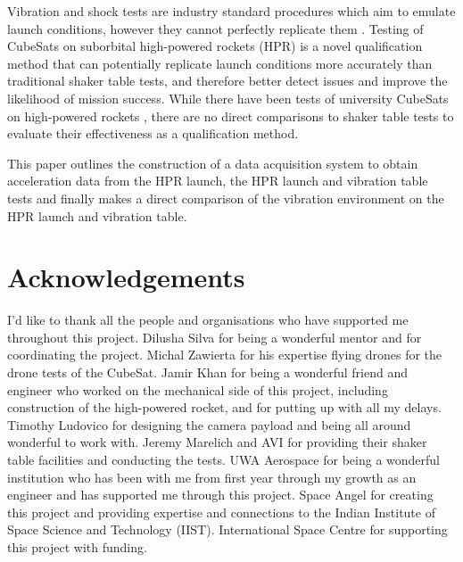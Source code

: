 \documentclass[a4paper,11pt]{article}
\begin{document}
Vibration and shock tests are industry standard procedures which aim to emulate launch conditions, however they cannot perfectly replicate them \cite{gordon2015benefits}. Testing of CubeSats on suborbital high-powered rockets (HPR) is a novel qualification method that can potentially replicate launch conditions more accurately than traditional shaker table tests, and therefore better detect issues and improve the likelihood of mission success. While there have been tests of university CubeSats on high-powered rockets \cite{slongo2019pre}, there are no direct comparisons to shaker table tests to evaluate their effectiveness as a qualification method.

This paper outlines the construction of a data acquisition system to obtain acceleration data from the HPR launch, the HPR launch and vibration table tests and finally makes a direct comparison of the vibration environment on the HPR launch and vibration table.


\section{Acknowledgements}

I'd like to thank all the people and organisations who have supported me throughout this project. Dilusha Silva for being a wonderful mentor and for coordinating the project. Michal Zawierta for his expertise flying drones for the drone tests of the CubeSat. Jamir Khan for being a wonderful friend and engineer who worked on the mechanical side of this project, including construction of the high-powered rocket, and for putting up with all my delays. Timothy Ludovico for designing the camera payload and being all around wonderful to work with. Jeremy Marelich and AVI for providing their shaker table facilities and conducting the tests. UWA Aerospace for being a wonderful institution who has been with me from first year through my growth as an engineer and has supported me through this project. Space Angel for creating this project and providing expertise and connections to the Indian Institute of Space Science and Technology (IIST). International Space Centre for supporting this project with funding.


\newpage
\tableofcontents
\newpage

\end{document}
